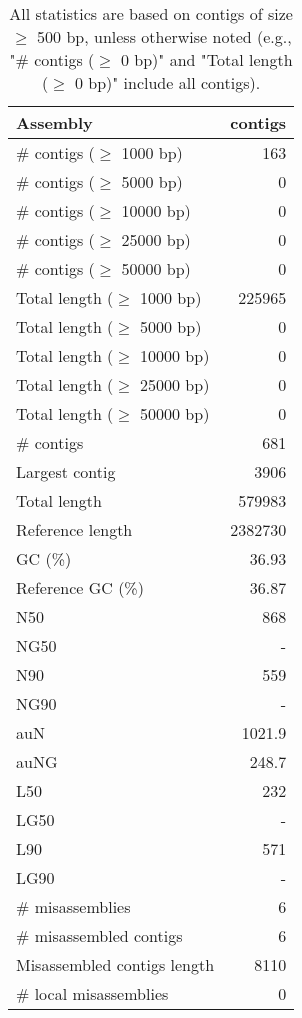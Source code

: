 \documentclass[12pt,a4paper]{article}
\begin{document}
\begin{table}[ht]
\begin{center}
\caption{All statistics are based on contigs of size $\geq$ 500 bp, unless otherwise noted (e.g., "\# contigs ($\geq$ 0 bp)" and "Total length ($\geq$ 0 bp)" include all contigs).}
\begin{tabular}{|l*{1}{|r}|}
\hline
Assembly & contigs \\ \hline
\# contigs ($\geq$ 1000 bp) & 163 \\ \hline
\# contigs ($\geq$ 5000 bp) & 0 \\ \hline
\# contigs ($\geq$ 10000 bp) & 0 \\ \hline
\# contigs ($\geq$ 25000 bp) & 0 \\ \hline
\# contigs ($\geq$ 50000 bp) & 0 \\ \hline
Total length ($\geq$ 1000 bp) & 225965 \\ \hline
Total length ($\geq$ 5000 bp) & 0 \\ \hline
Total length ($\geq$ 10000 bp) & 0 \\ \hline
Total length ($\geq$ 25000 bp) & 0 \\ \hline
Total length ($\geq$ 50000 bp) & 0 \\ \hline
\# contigs & 681 \\ \hline
Largest contig & 3906 \\ \hline
Total length & 579983 \\ \hline
Reference length & 2382730 \\ \hline
GC (\%) & 36.93 \\ \hline
Reference GC (\%) & 36.87 \\ \hline
N50 & 868 \\ \hline
NG50 & - \\ \hline
N90 & 559 \\ \hline
NG90 & - \\ \hline
auN & 1021.9 \\ \hline
auNG & 248.7 \\ \hline
L50 & 232 \\ \hline
LG50 & - \\ \hline
L90 & 571 \\ \hline
LG90 & - \\ \hline
\# misassemblies & 6 \\ \hline
\# misassembled contigs & 6 \\ \hline
Misassembled contigs length & 8110 \\ \hline
\# local misassemblies & 0 \\ \hline

\end{tabular}
\end{center}
\end{table}
\end{document}
